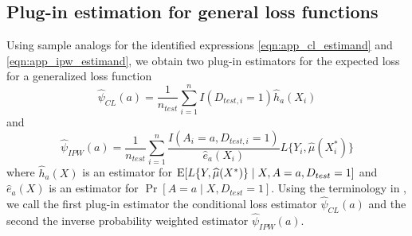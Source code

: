     \subsection{Plug-in estimation for general loss functions}
    Using sample analogs for the identified expressions \ref{eqn:app_cl_estimand} and \ref{eqn:app_ipw_estimand}, we obtain two plug-in estimators for the expected loss for a generalized loss function
    \begin{equation*}
        \widehat{\psi}_{CL}(a) = \frac{1}{n_{test}}\sum_{i=1}^nI(D_{test, i} = 1)\widehat{h}_a(X_i)
    \end{equation*}
    and 
    \begin{equation*}
        \widehat{\psi}_{IPW}(a) = \frac{1}{n_{test}} \sum_{i=1}^n \frac{I(A_i = a, D_{test, i} = 1)}{ \widehat{e}_a(X_i)} L\{Y_i, \widehat{\mu}(X^*_i)\}
    \end{equation*}
    where $\widehat{h}_a(X)$ is an estimator for $\operatorname{E}[L\{Y, \widehat{\mu}(X^*)\}\mid X,A = a, D_{test} = 1]$ and $\widehat{e}_a(X)$ is an estimator for $\Pr[A = a \mid X,D_{test} = 1]$. Using the terminology in \textcite{morrison_robust_2022}, we call the first plug-in estimator the conditional loss estimator $ \widehat{\psi}_{CL}(a)$ and the second the inverse probability weighted estimator $\widehat{\psi}_{IPW}(a)$. 

    
